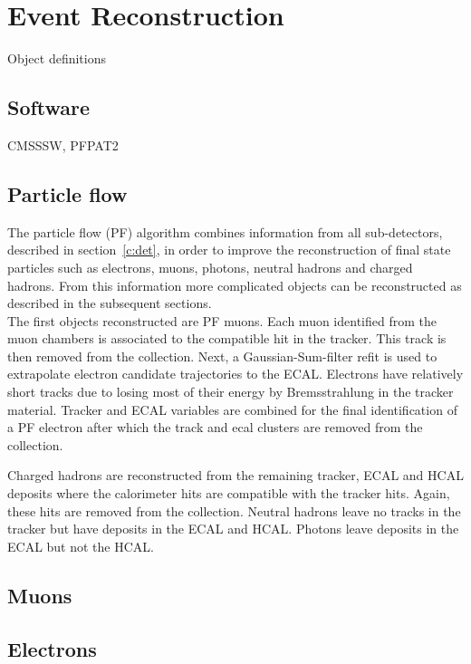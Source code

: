 \chapter{Event Reconstruction}
\label{c:recon}
Object definitions

\section{Software}

CMSSSW, PFPAT2

\section{Particle flow}

The particle flow (PF) algorithm combines information from all sub-detectors, described in section~\ref{c:det}, in order to improve the reconstruction of final state particles such as electrons, muons, photons, neutral hadrons and charged hadrons. From this information more complicated objects can be reconstructed as described in the subsequent sections.\\

The first objects reconstructed are PF muons. Each muon identified from the muon chambers is associated to the compatible hit in the tracker. This track is then removed from the collection. Next, a Gaussian-Sum-filter refit is used to extrapolate electron candidate trajectories to the ECAL. Electrons have relatively short tracks due to losing most of their energy by Bremsstrahlung in the tracker material. Tracker and ECAL variables are combined for the final identification of a PF electron after which the track and ecal clusters are removed from the collection.

Charged hadrons are reconstructed from the remaining tracker, ECAL and HCAL deposits where the calorimeter hits are compatible with the tracker hits. Again, these hits are removed from the collection. Neutral hadrons leave no tracks in the tracker but have deposits in the ECAL and HCAL. Photons leave deposits in the ECAL but not the HCAL.
\section{Muons}

\section{Electrons}

